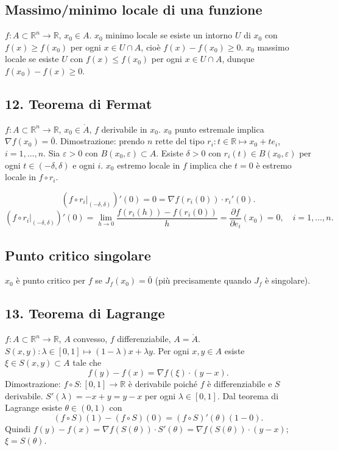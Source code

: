 \documentclass[11pt,a4paper]{article}
\newcommand{\R}{\mathbb R}\newcommand{\N}{\mathbb N}\newcommand{\pagina}[1]{\clearpage}
\begin{document}
\subsection*{Massimo/minimo locale di una funzione}
$f:A\subset\R^n\to\R$, $x_0\in A$. $x_0$ minimo locale se esiste un intorno $U$ di $x_0$ con $f(x)\ge f(x_0)$ per ogni $x\in U\cap A$, cioè $f(x)-f(x_0)\ge0$. $x_0$ massimo locale se esiste $U$ con $f(x)\le f(x_0)$ per ogni $x\in U\cap A$, dunque $f(x_0)-f(x)\ge0$.
\subsection*{12. Teorema di Fermat}
$f:A\subset\R^n\to\R$, $x_0\in\mathring A$, $f$ derivabile in $x_0$. $x_0$ punto estremale implica $\nabla f(x_0)=\bar0$.
Dimostrazione: prendo $n$ rette del tipo $r_i:t\in\R\mapsto x_0+te_i$, $i=1,\ldots,n$. Sia $\varepsilon>0$ con $B(x_0,\varepsilon)\subset A$. Esiste $\delta>0$ con $r_i(t)\in B(x_0,\varepsilon)$ per ogni $t\in(-\delta,\delta)$ e ogni $i$. $x_0$ estremo locale in $f$ implica che $t=0$ è estremo locale in $f\circ r_i$.
\begin{center}\end{center}
\pagina{27}
\[\left(f\circ r_i|_{(-\delta,\delta)}\right)'(0)=0=\nabla f(r_i(0))\cdot r_i'(0).\]
\[\left(f\circ r_i|_{(-\delta,\delta)}\right)'(0)=\lim_{h\to0}\frac{f(r_i(h))-f(r_i(0))}{h}=\frac{\partial f}{\partial e_i}(x_0)=0,\quad i=1,\ldots,n.\]
\subsection*{Punto critico singolare}
$x_0$ è punto critico per $f$ se $J_f(x_0)=\bar0$ (più precisamente quando $J_f$ è singolare).
\subsection*{13. Teorema di Lagrange}
$f:A\subset\R^n\to\R$, $A$ convesso, $f$ differenziabile, $A=\mathring A$. $S(x,y):\lambda\in[0,1]\mapsto(1-\lambda)x+\lambda y$. Per ogni $x,y\in A$ esiste $\xi\in S(x,y)\subset A$ tale che
\[f(y)-f(x)=\nabla f(\xi)\cdot(y-x).\]
Dimostrazione: $f\circ S:[0,1]\to\R$ è derivabile poiché $f$ è differenziabile e $S$ derivabile. $S'(\lambda)=-x+y=y-x$ per ogni $\lambda\in[0,1]$. Dal teorema di Lagrange esiste $\theta\in(0,1)$ con
\[(f\circ S)(1)-(f\circ S)(0)=(f\circ S)'(\theta)(1-0).\]
Quindi $f(y)-f(x)=\nabla f(S(\theta))\cdot S'(\theta)=\nabla f(S(\theta))\cdot(y-x)$; $\xi=S(\theta)$.
\end{document}
